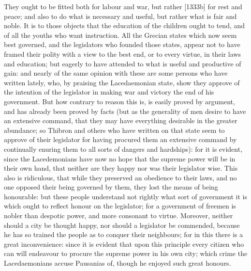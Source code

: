 They ought to be fitted both for labour and war, but rather [1333b] for
rest and peace; and also to do what is necessary and useful, but rather
what is fair and noble. It is to those objects that the education of the
children ought to tend, and of all the youths who want instruction. All
the Grecian states which now seem best governed, and the legislators who
founded those states, appear not to have framed their polity with a view
to the best end, or to every virtue, in their laws and education; but
eagerly to have attended to what is useful and productive of gain: and
nearly of the same opinion with these are some persons who have written
lately, who, by praising the Lacedaemonian state, show they approve of the
intention of the legislator in making war and victory the end of his
government. But how contrary to reason this is, is easily proved by
argument, and has already been proved by facts (but as the generality of
men desire to have an extensive command, that they may have everything
desirable in the greater abundance; so Thibron and others who have written
on that state seem to approve of their legislator for having procured them
an extensive command by continually enuring them to all sorts of dangers
and hardships): for it is evident, since the Lacedemonians have now no
hope that the supreme power will be in their own hand, that neither are
they happy nor was their legislator wise. This also is ridiculous, that
while they preserved an obedience to their laws, and no one opposed their
being governed by them, they lost the means of being honourable: but these
people understand not rightly what sort of government it is which ought to
reflect honour on the legislator; for a government of freemen is nobler
than despotic power, and more consonant to virtue. Moreover, neither
should a city be thought happy, nor should a legislator be commended,
because he has so trained the people as to conquer their neighbours; for
in this there is a great inconvenience: since it is evident that upon this
principle every citizen who can will endeavour to procure the supreme
power in his own city; which crime the Lacedaemonians accuse Pausanias of,
though he enjoyed such great honours.


